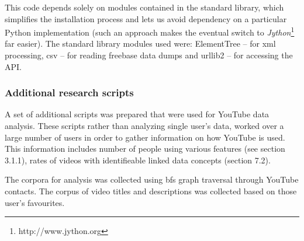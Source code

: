 This code depends solely on modules contained in the standard library, which
simplifies the installation process and lets us avoid dependency on a particular
Python implementation (such an approach makes the eventual switch to \textit{Jython}\footnote{http://www.jython.org} far
easier). The standard library modules used were: ElementTree -- for xml
processing, csv -- for reading freebase data dumps and urllib2 -- for accessing
the API.

\subsubsection{Additional research scripts}

A set of additional scripts was prepared that were used for YouTube data
analysis. These scripts rather than analyzing single user's data, worked over a
large number of users in order to gather information on how YouTube is used.
This information includes number of people using various features (see section
3.1.1), rates of videos with identifieable linked data concepts (section 7.2).

The corpora for analysis was collected using bfs graph traversal through YouTube
contacts. The corpus of video titles and descriptions was collected based on
those user's favourites.